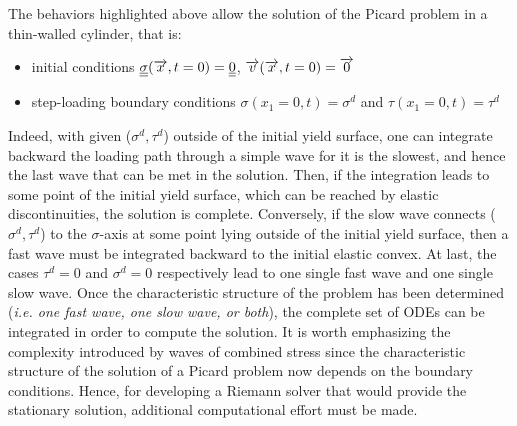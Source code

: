 The behaviors highlighted above allow the solution of the Picard problem in a thin-walled cylinder, that is:
\begin{itemize}
\item initial conditions ${\underline{\underline{\sigma}}}({\overrightarrow{x}},t=0)={\underline{\underline{0}}}$, ${\overrightarrow{v}}({\overrightarrow{x}},t=0)={\overrightarrow{0}}$
\item step-loading boundary conditions $\sigma(x_1=0,t)=\sigma^d$ and $\tau(x_1=0,t)=\tau^d$
\end{itemize}
Indeed, with given ($\sigma^d,\tau^d$) outside of the initial yield surface, one can integrate backward the loading path through a simple wave for it is the slowest, and hence the last wave that can be met in the solution.
Then, if the integration leads to some point of the initial yield surface, which can be reached by elastic discontinuities, the solution is complete.
Conversely, if the slow wave connects ($\sigma^d,\tau^d$) to the $\sigma$-axis at some point lying outside of the initial yield surface, then a fast wave must be integrated backward to the initial elastic convex.
At last, the cases $\tau^d=0$ and $\sigma^d=0$ respectively lead to one single fast wave and one single slow wave.
Once the characteristic structure of the problem has been determined (\textit{i.e. one fast wave, one slow wave, or both}), the complete set of ODEs can be integrated in order to compute the solution.
It is worth emphasizing the complexity introduced by waves of combined stress since the characteristic structure of the solution of a Picard problem now depends on the boundary conditions.
Hence, for developing a Riemann solver that would provide the stationary solution, additional computational effort must be made.

